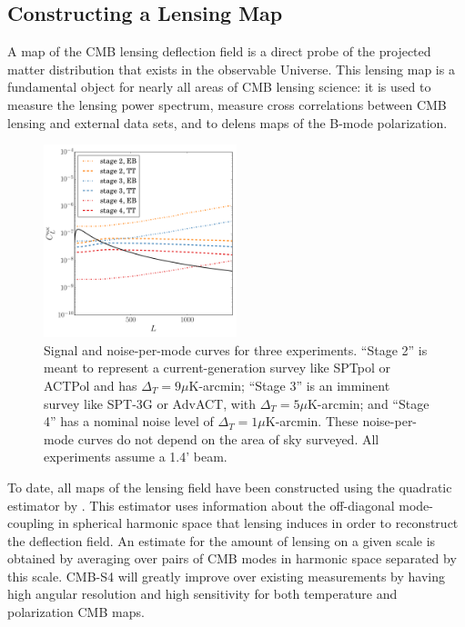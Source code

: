 \subsection{Constructing a Lensing Map}\label{kappaMap}

A map of the CMB lensing deflection field is a direct probe of the projected matter distribution that exists in the observable Universe. This lensing map is a fundamental object for nearly all areas of CMB lensing science: it is used to measure the lensing power spectrum, measure cross correlations between CMB lensing and external data sets, and to delens maps of the B-mode polarization.  


\begin{figure}[htbp]
\centering
\includegraphics[width=0.5\textwidth]{CMBLensing/n0s_s4.pdf}
\caption{Signal and noise-per-mode curves for three experiments. ``Stage 2'' is meant to represent a current-generation survey like SPTpol or ACTPol and has $\Delta_T = 9 \mu$K-arcmin; ``Stage 3'' is an imminent survey like SPT-3G or AdvACT, with $\Delta_T = 5 \mu$K-arcmin; and ``Stage 4'' has a nominal noise level of  $\Delta_T = 1 \mu$K-arcmin.   These noise-per-mode curves do not depend on the area of sky surveyed.  All experiments assume a 1.4' beam.}  
\label{n0s_s4}
\end{figure}


To date, all maps of the lensing field have been constructed using the quadratic estimator by \cite{Hu:2001kj}.  This estimator uses information about the off-diagonal mode-coupling in spherical harmonic space that lensing induces in order to reconstruct the deflection field.  An estimate for the amount of lensing on a given scale is obtained by averaging over pairs of CMB modes in harmonic space separated by this scale. CMB-S4 will greatly improve over existing measurements by having high angular resolution and high sensitivity for both temperature and polarization CMB maps.

